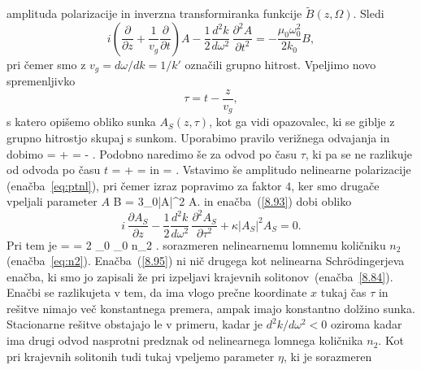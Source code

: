 amplituda polarizacije in inverzna transformiranka 
funkcije $\tilde{B}(z,\Omega)$.
Sledi
\begin{equation}
i (\frac{\partial}{\partial z}+\frac{1}{v_{g}}\frac{\partial}{\partial t})A-
\frac{1}{2}\frac{d^{2}k}{d\omega^{2}}\,\frac{\partial^{2}A}{\partial t^{2}}=
-\frac{\mu_0\omega_0^2}{2 k_0}B,
\label{8.93}
\end{equation}
pri čemer smo z $v_g = d\omega/dk = 1/k'$ označili grupno hitrost.
Vpeljimo novo spremenljivko 
\begin{equation}
\tau=t-\frac{z}{v_{g}},
\end{equation}
s katero opišemo obliko sunka $A_S(z,\tau)$, kot ga vidi opazovalec, ki se giblje
z grupno hitrostjo skupaj s sunkom. Uporabimo pravilo verižnega odvajanja in dobimo
\beq
{} =  + 
=  - .
\eeq
Podobno naredimo še za odvod po času $\tau$, ki pa se ne razlikuje od odvoda po času $t$
\beq
{} = +
=  
\eeq
in
\beq
{} = .
\eeq
Vstavimo še amplitudo nelinearne polarizacije (enačba~\ref{eq:ptnl}), pri čemer izraz popravimo
za faktor $4$, ker smo drugače vpeljali parameter $A$
\beq
B = 3\varepsilon_0\chi |A|^2 A.
\eeq
in enačba~(\ref{8.93}) dobi obliko 
\begin{equation}
i\,\frac{\partial A_S}{\partial z}-\frac{1}{2}\frac{d^{2}k}{d\omega^{2}}\,\frac{\partial^{2}A_S}{\partial\tau^{2}}+\kappa\left|A_S\right|^{2}A_S=0.
\label{8.95}
\end{equation}
Pri tem je 
\beq
\kappa =  = 2 \omega_0 \varepsilon_0 n_2 .
\eeq
sorazmeren nelinearnemu lomnemu količniku $n_2$ 
(enačba~\ref{eq:n2}). Enačba~(\ref{8.95}) ni nič drugega kot nelinearna Schr\"odingerjeva 
enačba, ki smo jo 
zapisali že pri izpeljavi krajevnih solitonov~(enačba~\ref{8.84}). Enačbi se razlikujeta v tem, da
ima vlogo prečne koordinate $x$ tukaj čas $\tau$ in rešitve nimajo več konstantnega premera,
ampak imajo konstantno dolžino sunka. Stacionarne rešitve obstajajo le v primeru, kadar je  $d^{2}k/d\omega^{2}<0$ oziroma kadar ima drugi odvod nasprotni predznak od nelinearnega lomnega količnika $n_2$. Kot pri krajevnih solitonih tudi tukaj vpeljemo parameter $\eta$, ki je sorazmeren 
